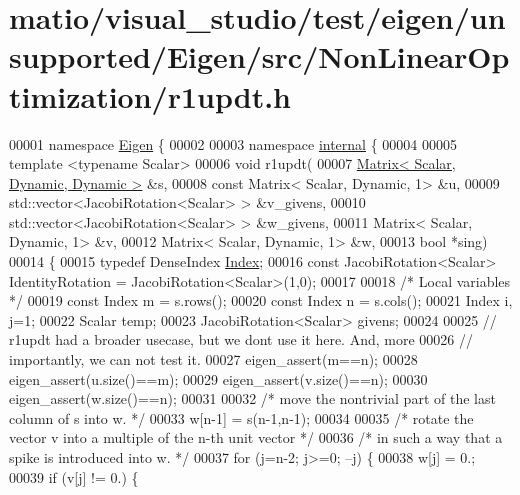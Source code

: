 \hypertarget{matio_2visual__studio_2test_2eigen_2unsupported_2_eigen_2src_2_non_linear_optimization_2r1updt_8h_source}{}\section{matio/visual\+\_\+studio/test/eigen/unsupported/\+Eigen/src/\+Non\+Linear\+Optimization/r1updt.h}
\label{matio_2visual__studio_2test_2eigen_2unsupported_2_eigen_2src_2_non_linear_optimization_2r1updt_8h_source}

\begin{DoxyCode}
00001 \textcolor{keyword}{namespace }\hyperlink{namespace_eigen}{Eigen} \{ 
00002 
00003 \textcolor{keyword}{namespace }\hyperlink{namespaceinternal}{internal} \{
00004 
00005 \textcolor{keyword}{template} <\textcolor{keyword}{typename} Scalar>
00006 \textcolor{keywordtype}{void} r1updt(
00007         \hyperlink{group___core___module}{Matrix< Scalar, Dynamic, Dynamic >} &s,
00008         \textcolor{keyword}{const} Matrix< Scalar, Dynamic, 1> &u,
00009         std::vector<JacobiRotation<Scalar> > &v\_givens,
00010         std::vector<JacobiRotation<Scalar> > &w\_givens,
00011         Matrix< Scalar, Dynamic, 1> &v,
00012         Matrix< Scalar, Dynamic, 1> &w,
00013         \textcolor{keywordtype}{bool} *sing)
00014 \{
00015     \textcolor{keyword}{typedef} DenseIndex \hyperlink{namespace_eigen_a62e77e0933482dafde8fe197d9a2cfde}{Index};
00016     \textcolor{keyword}{const} JacobiRotation<Scalar> IdentityRotation = JacobiRotation<Scalar>(1,0);
00017 
00018     \textcolor{comment}{/* Local variables */}
00019     \textcolor{keyword}{const} Index m = s.rows();
00020     \textcolor{keyword}{const} Index n = s.cols();
00021     Index i, j=1;
00022     Scalar temp;
00023     JacobiRotation<Scalar> givens;
00024 
00025     \textcolor{comment}{// r1updt had a broader usecase, but we dont use it here. And, more}
00026     \textcolor{comment}{// importantly, we can not test it.}
00027     eigen\_assert(m==n);
00028     eigen\_assert(u.size()==m);
00029     eigen\_assert(v.size()==n);
00030     eigen\_assert(w.size()==n);
00031 
00032     \textcolor{comment}{/* move the nontrivial part of the last column of s into w. */}
00033     w[n-1] = s(n-1,n-1);
00034 
00035     \textcolor{comment}{/* rotate the vector v into a multiple of the n-th unit vector */}
00036     \textcolor{comment}{/* in such a way that a spike is introduced into w. */}
00037     \textcolor{keywordflow}{for} (j=n-2; j>=0; --j) \{
00038         w[j] = 0.;
00039         \textcolor{keywordflow}{if} (v[j] != 0.) \{

\end{DoxyCode}
